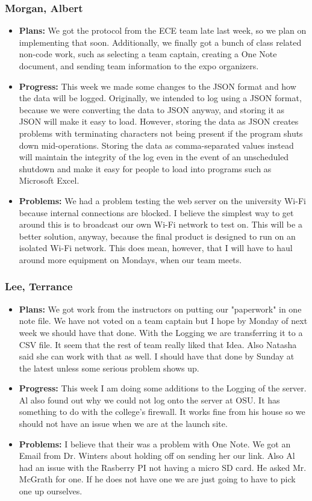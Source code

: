 \documentclass[10pt,draftclsnofoot,onecolumn]{IEEEtran}
\begin{document}
\subsubsection{Morgan, Albert}
\begin{itemize}
	\item \textbf{Plans: }
	We got the protocol from the ECE team late last week, so we plan on implementing that soon. Additionally, we finally got a bunch of class related non-code work, such as selecting a team captain, creating a One Note document, and sending team information to the expo organizers.
	\item \textbf{Progress: }
	This week we made some changes to the JSON format and how the data will be logged. Originally, we intended to log using a JSON format, because we were converting the data to JSON anyway, and storing it as JSON will make it easy to load. However, storing the data as JSON creates problems with terminating characters not being present if the program shuts down mid-operations. Storing the data as comma-separated values instead will maintain the integrity of the log even in the event of an unscheduled shutdown and make it easy for people to load into programs such as Microsoft Excel.
	\item \textbf{Problems: }
	We had a problem testing the web server on the university Wi-Fi because internal connections are blocked. I believe the simplest way to get around this is to broadcast our own Wi-Fi network to test on. This will be a better solution, anyway, because the final product is designed to run on an isolated Wi-Fi network. This does mean, however, that I will have to haul around more equipment on Mondays, when our team meets.
\end{itemize}
\subsubsection{Lee, Terrance}
\begin{itemize}
	\item \textbf{Plans: }
	We got work from the instructors on putting our "paperwork" in one note file. We have not voted on a team captain but I hope by Monday of next week we should have that done. With the Logging we are transferring it to a CSV file. It seem that the rest of team really liked that Idea. Also Natasha said she can work with that as well. I should have that done by Sunday at the latest unless some serious problem shows up.
	\item \textbf{Progress: }
	This week I am doing some additions to the Logging of the server. Al also found out why we could not log onto the server at OSU. It has something to do with the college's firewall. It works fine from his house so we should not have an issue when we are at the launch site.
	\item \textbf{Problems: }
	I believe that their was a problem with One Note. We got an Email from Dr. Winters about holding off on sending her our link. Also Al had an issue with the Rasberry PI not having a micro SD card. He asked Mr. McGrath for one. If he does not have one we are just going to have to pick one up ourselves.
\end{itemize}
\end{document}
